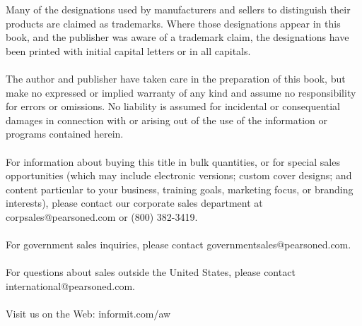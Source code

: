 \thispagestyle{empty}
\vspace*{\fill}
{\footnotesize 
\noindent Many of the designations used by manufacturers and sellers to distinguish their products are claimed as trademarks. Where those designations appear in this book, and the publisher was aware of a trademark claim, the designations have been printed with initial capital letters or in all capitals.\\
\hspace{\fill}\\
\noindent The author and publisher have taken care in the preparation of this book, but make no expressed or implied warranty of any kind and assume no responsibility for errors or omissions. No liability is assumed for incidental or consequential damages in connection with or arising out of the use of the information or programs contained herein.\\   %
\hspace{\fill}\\
\noindent For information about buying this title in bulk quantities, or for special sales opportunities (which may include electronic versions; custom cover designs; and content particular to your business, training goals, marketing focus, or branding interests), please contact our corporate sales department at \mbox{corpsales}\linebreak[3]@\linebreak[3]pearsoned\linebreak[3].com or (800) 382-3419.\\
\hspace{\fill}\\
\noindent For government sales inquiries, please contact governmentsales@pearsoned.com.\\
\hspace{\fill}\\
\noindent For questions about sales outside the United States, please contact international@pearsoned.com.\\
\hspace{\fill}\\
\noindent Visit us on the Web: informit.com/aw\\     %
\hspace{\fill}\\
}
